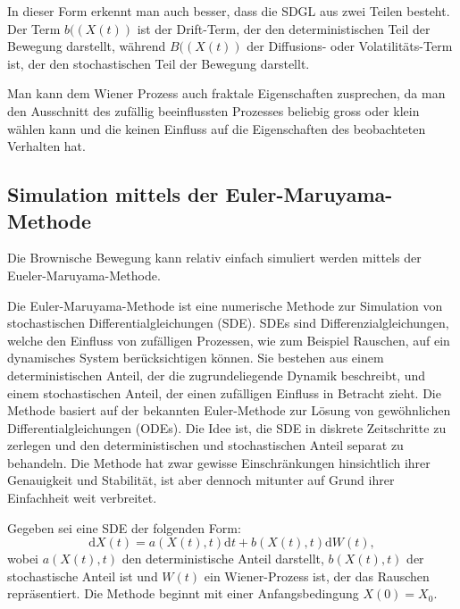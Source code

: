 In dieser Form erkennt man auch besser, dass die SDGL aus zwei Teilen besteht. Der Term $ b((X(t)) $ ist der \glqq{}Drift\glqq{}-Term, der den deterministischen Teil der Bewegung darstellt, während $ B((X(t)) $ der \glqq{}Diffusions- oder Volatilitäts-Term\glqq{} ist, der den stochastischen Teil der Bewegung darstellt.


Man kann dem Wiener Prozess auch fraktale Eigenschaften zusprechen, da man den Ausschnitt des zufällig beeinflussten Prozesses beliebig gross oder klein wählen kann und die keinen Einfluss auf die Eigenschaften des beobachteten Verhalten hat.


\subsection{Simulation mittels der Euler-Maruyama-Methode
	\label{brown:Simulation}}

Die Brownische Bewegung kann relativ einfach simuliert werden mittels der Eueler-Maruyama-Methode.

Die Euler-Maruyama-Methode ist eine numerische Methode zur Simulation von stochastischen Differentialgleichungen (SDE). SDEs sind Differenzialgleichungen, welche den Einfluss von zufälligen Prozessen, wie zum Beispiel Rauschen, auf ein dynamisches System berücksichtigen können. Sie bestehen aus einem deterministischen Anteil, der die zugrundeliegende Dynamik beschreibt, und einem stochastischen Anteil, der einen zufälligen Einfluss in Betracht zieht. Die Methode basiert auf der bekannten Euler-Methode zur Lösung von gewöhnlichen Differentialgleichungen (ODEs). Die Idee ist, die SDE in diskrete Zeitschritte zu zerlegen und den deterministischen und stochastischen Anteil separat zu behandeln. Die Methode hat zwar gewisse Einschränkungen hinsichtlich ihrer Genauigkeit und Stabilität, ist aber dennoch mitunter auf Grund ihrer Einfachheit weit verbreitet.

Gegeben sei eine SDE der folgenden Form:
\begin{equation}
	\mathrm{d}X(t) = a(X(t), t) \mathrm{d}t + b(X(t), t) \mathrm{d}W(t),
\end{equation}
wobei $ a(X(t), t) $ den deterministische Anteil darstellt, $ b(X(t), t) $ der stochastische Anteil ist und $ W(t) $ ein Wiener-Prozess ist, der das Rauschen repräsentiert. Die Methode beginnt mit einer Anfangsbedingung $X(0) = X_0$.

